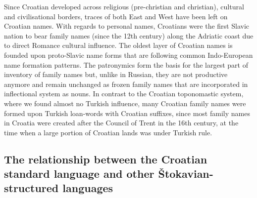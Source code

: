 \begin{multicols}{2}

Since Croatian developed across religious (pre-christian and christian), cultural and civilisational borders, traces of both East and West have been left on Croatian names. With regards to personal names, Croatians were the first Slavic nation to bear family names (since the 12th century) along the Adriatic coast due to direct Romance cultural influence. The oldest layer of Croatian names is founded upon proto-Slavic name forms that are following common Indo-European name formation patterns. The patronymics form the basis for the largest part of inventory of family names but, unlike in Russian, they are not productive anymore and remain unchanged as frozen family names that are incorporated in inflectional system as nouns. In contrast to the Croatian toponomastic system, where we found almost no Turkish influence, many Croatian family names were formed upon Turkish loan-words with Croatian suffixes, since most family names in Croatia were created after the Council of Trent in the 16th century, at the time when a large portion of Croatian lands was under Turkish rule.

\subsection{The relationship between the Croatian standard language and other Štokavian-structured languages}


\end{multicols}
